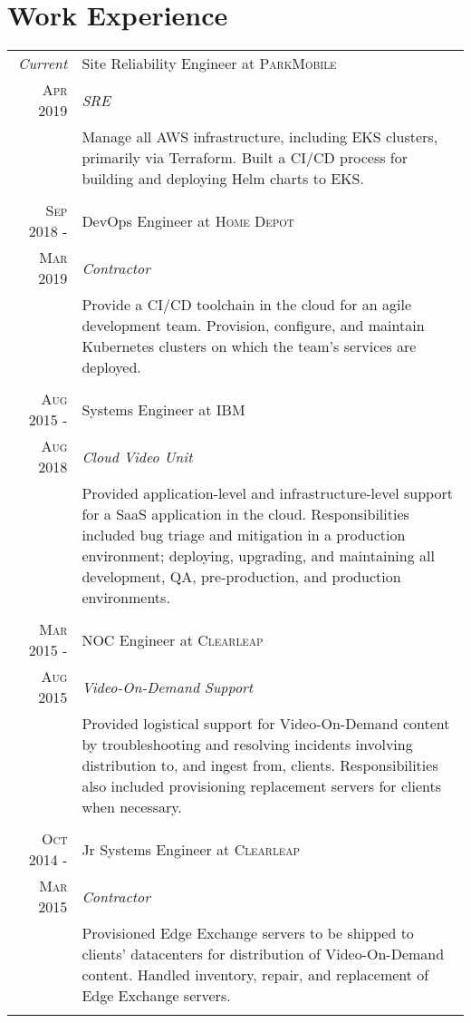 \documentclass[a4paper,9pt]{extarticle}
\begin{document}
\section{Work Experience}
\begin{tabular}{r|p{8.5cm}}
 \emph{Current}&Site Reliability Engineer at \textsc{ParkMobile}\\\textsc{Apr 2019}&\emph{SRE}\\&\footnotesize{Manage all AWS infrastructure, including EKS clusters, primarily via Terraform. Built a CI/CD process for building and deploying Helm charts to EKS.}\\\multicolumn{2}{c}{}\\
 \textsc{Sep 2018 -}&DevOps Engineer at \textsc{Home Depot}\\\textsc{Mar 2019}&\emph{Contractor}\\&\footnotesize{Provide a CI/CD toolchain in the cloud for an agile development team. Provision, configure, and maintain Kubernetes clusters on which the team's services are deployed.}\\\multicolumn{2}{c}{}\\
 \textsc{Aug 2015 -}&Systems Engineer at \textsc{IBM}\\\textsc{Aug 2018}&\emph{Cloud Video Unit}\\&\footnotesize{Provided application-level and infrastructure-level support for a SaaS application in the cloud. Responsibilities included bug triage and mitigation in a production environment; deploying, upgrading, and maintaining all development, QA, pre-production, and production environments.}\\\multicolumn{2}{c}{}\\
 \textsc{Mar 2015 -}&NOC Engineer at \textsc{Clearleap}\\\textsc{Aug 2015}&\emph{Video-On-Demand Support}\\&\footnotesize{Provided logistical support for Video-On-Demand content by troubleshooting and resolving incidents involving distribution to, and ingest from, clients. Responsibilities also included provisioning replacement servers for clients when necessary.}\\\multicolumn{2}{c}{}\\
 \textsc{Oct 2014 -}&Jr Systems Engineer at \textsc{Clearleap}\\\textsc{Mar 2015}&\emph{Contractor}\\&\footnotesize{Provisioned Edge Exchange servers to be shipped to clients' datacenters for distribution of Video-On-Demand content. Handled inventory, repair, and replacement of Edge Exchange servers.}\\\multicolumn{2}{c}{}\\
\end{tabular}
\end{document}
